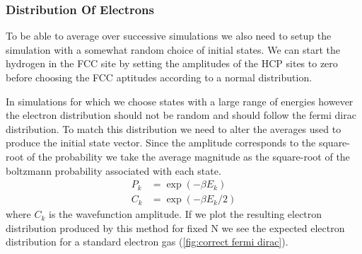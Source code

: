 \subsubsection{Distribution Of Electrons}
To be able to average over successive
simulations we also need to setup the
simulation with a somewhat random
choice of initial states.
We can start the hydrogen
in the FCC site by setting the
amplitudes of the HCP sites to zero
before choosing the FCC aptitudes according to
a normal distribution.

In simulations for which we choose states
with a large range of energies however
the electron distribution should not be
random and should follow the fermi dirac distribution.
To match this distribution we
need to alter the averages used
to produce the initial state vector.
Since the amplitude corresponds to
the square-root of the probability we
take the average magnitude as the
square-root of the boltzmann probability
associated with each state.
\begin{align}
    P_k & = \exp(-\beta{}E_k)     \\
    C_k & = \exp(-\beta{}E_k / 2)
\end{align}
where \(C_k\) is the wavefunction amplitude.
If we plot the resulting
electron distribution produced
by this method for fixed N
we see the expected electron
distribution for a standard electron
gas (\cref{fig:correct fermi dirac}).
